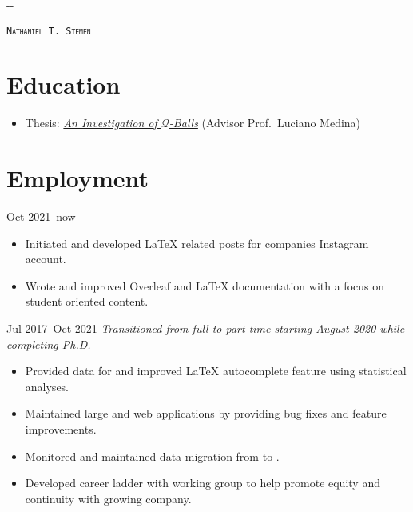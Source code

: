 \documentclass{cultvoucher}
\begin{document}
\thispagestyle{firststyle}


\begin{adjustwidth}{\dimexpr-\marginparsep-\marginparwidth}{}
	\begin{center}
		{\HUGE \textsc{\texttt{Nathaniel T. Stemen}}\par}
		 \; \separator \; 
	\end{center}
\end{adjustwidth}

\section{Education}

\begin{itemize}
	\vspace{-0.25em}
	\item Thesis: \href{https://natestemen.xyz/qv-thesis.pdf}{\textit{An Investigation of $\mathcal{Q}$-Balls}} (Advisor Prof.\ Luciano Medina)
\end{itemize}

\section{Employment}
{Oct 2021--now}
\begin{itemize}
	\vspace{-0.25em}
	\item Initiated and developed \LaTeX{} related posts for companies Instagram account.
	\item Wrote and improved Overleaf and \LaTeX{} documentation with a focus on student oriented content.
\end{itemize}
{Jul 2017--Oct 2021}
\vspace{-0.25em}
\emph{Transitioned from full to part-time starting August 2020 while completing Ph.D.}
\begin{itemize}
	\vspace{-0.25em}
	\item Provided data for and improved \LaTeX{} autocomplete feature using statistical analyses.
	\item Maintained large  and  web applications by providing bug fixes and feature improvements.
	\item Monitored and maintained data-migration from  to .
	\item Developed career ladder with working group to help promote equity and continuity with growing company.
\end{itemize}
\end{document}
